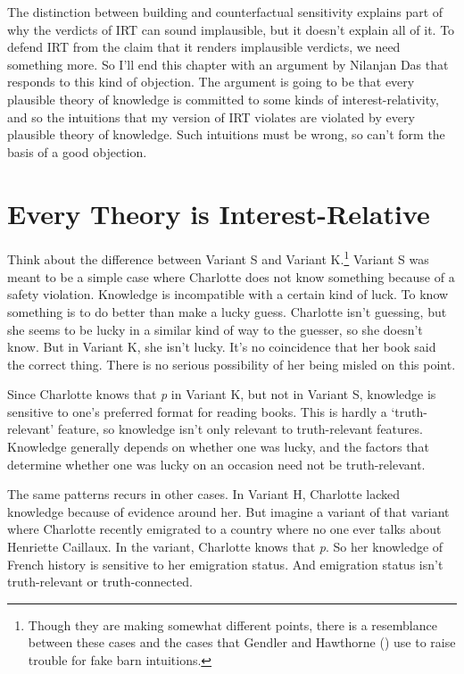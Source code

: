 \documentclass[
  10pt,
  letterpaper,
  twoside]{scrbook}
\begin{document}
The distinction between building and counterfactual sensitivity explains
part of why the verdicts of IRT can sound implausible, but it doesn't
explain all of it. To defend IRT from the claim that it renders
implausible verdicts, we need something more. So I'll end this chapter
with an argument by Nilanjan Das that responds to this kind of
objection. The argument is going to be that every plausible theory of
knowledge is committed to some kinds of interest-relativity, and so the
intuitions that my version of IRT violates are violated by every
plausible theory of knowledge. Such intuitions must be wrong, so can't
form the basis of a good objection.

\section{Every Theory is Interest-Relative}\label{sec-das}

Think about the difference between Variant S and Variant K.\footnote{Though
  they are making somewhat different points, there is a resemblance
  between these cases and the cases that Gendler and Hawthorne
  () use to raise trouble for fake barn
  intuitions.} Variant S was meant to be a simple case where Charlotte
does not know something because of a safety violation. Knowledge is
incompatible with a certain kind of luck. To know something is to do
better than make a lucky guess. Charlotte isn't guessing, but she seems
to be lucky in a similar kind of way to the guesser, so she doesn't
know. But in Variant K, she isn't lucky. It's no coincidence that her
book said the correct thing. There is no serious possibility of her
being misled on this point.

Since Charlotte knows that \emph{p} in Variant K, but not in Variant S,
knowledge is sensitive to one's preferred format for reading books. This
is hardly a `truth-relevant' feature, so knowledge isn't only relevant
to truth-relevant features. Knowledge generally depends on whether one
was lucky, and the factors that determine whether one was lucky on an
occasion need not be truth-relevant.

The same patterns recurs in other cases. In Variant H, Charlotte lacked
knowledge because of evidence around her. But imagine a variant of that
variant where Charlotte recently emigrated to a country where no one
ever talks about Henriette Caillaux. In the variant, Charlotte knows
that \emph{p}. So her knowledge of French history is sensitive to her
emigration status. And emigration status isn't truth-relevant or
truth-connected.
\end{document}
